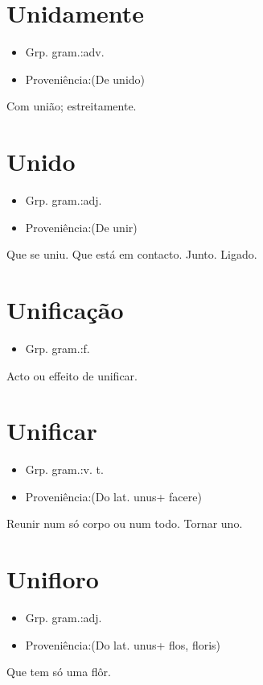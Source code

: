 \documentclass{article}
\begin{document}
\section{Unidamente}
\begin{itemize}
\item {Grp. gram.:adv.}
\end{itemize}
\begin{itemize}
\item {Proveniência:(De \textunderscore unido\textunderscore )}
\end{itemize}
Com união; estreitamente.
\section{Unido}
\begin{itemize}
\item {Grp. gram.:adj.}
\end{itemize}
\begin{itemize}
\item {Proveniência:(De \textunderscore unir\textunderscore )}
\end{itemize}
Que se uniu.
Que está em contacto.
Junto.
Ligado.
\section{Unificação}
\begin{itemize}
\item {Grp. gram.:f.}
\end{itemize}
Acto ou effeito de unificar.
\section{Unificar}
\begin{itemize}
\item {Grp. gram.:v. t.}
\end{itemize}
\begin{itemize}
\item {Proveniência:(Do lat. \textunderscore unus\textunderscore  + \textunderscore facere\textunderscore )}
\end{itemize}
Reunir num só corpo ou num todo.
Tornar uno.
\section{Unifloro}
\begin{itemize}
\item {Grp. gram.:adj.}
\end{itemize}
\begin{itemize}
\item {Proveniência:(Do lat. \textunderscore unus\textunderscore  + \textunderscore flos\textunderscore , \textunderscore floris\textunderscore )}
\end{itemize}
Que tem só uma flôr.
\end{document}
